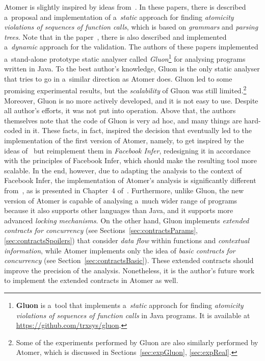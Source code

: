 Atomer is slightly inspired by ideas from~\cite{contracts2017, contracts2015}. In these papers, there is described a~proposal and implementation of a~\emph{static} approach for finding \emph{atomicity violations of sequences of function calls}, which is based on \emph{grammars} and \emph{parsing trees}. Note that in the paper~\cite{contracts2017}, there is also described and implemented a~\emph{dynamic} approach for the validation. The authors of these papers implemented a~stand-alone prototype static analyser called \emph{Gluon}\footnote{\textbf{Gluon} is a~tool that implements a~\emph{static} approach for finding \emph{atomicity violations of sequences of function calls} in Java programs. It is available at \url{https://github.com/trxsys/gluon}.} for analysing programs written in Java. To the best author's knowledge, Gluon is the only static analyser that tries to go in a~similar direction as Atomer does. Gluon led to some promising experimental results, but the \emph{scalability} of Gluon was still limited.\footnote{Some of the experiments performed by Gluon are also similarly performed by Atomer, which is discussed in Sections~\ref{sec:expGluon}, \ref{sec:expReal}.} Moreover, Gluon is no more actively developed, and it is not easy to use. Despite all author's efforts, it was not put into operation. Above that, the authors themselves note that the code of Gluon is very ad hoc, and many things are hard-coded in it. These facts, in fact, inspired the decision that eventually led to the implementation of the first version of Atomer, namely, to get inspired by the ideas of~\cite{contracts2017, contracts2015} but reimplement them in \emph{Facebook Infer}, redesigning it in accordance with the principles of Facebook Infer, which should make the resulting tool more scalable. In the end, however, due to adapting the analysis to the context of Facebook Infer, the implementation of Atomer's analysis is significantly different from~\cite{contracts2017, contracts2015}, as is presented in Chapter~4 of~\cite{harmimBP}. Furthermore, unlike Gluon, the new version of Atomer is capable of analysing a~much wider range of programs because it also supports other languages than Java, and it supports more advanced \emph{locking mechanisms}. On the other hand, Gluon implements \emph{extended contracts for concurrency} (see Sections~\ref{sec:contractsParams}, \ref{sec:contractsSpoilers}) that consider \emph{data flow} within functions and \emph{contextual information}, while Atomer implements only the idea of \emph{basic contracts for concurrency} (see Section~\ref{sec:contractsBasic}). These extended contracts should improve the precision of the analysis. Nonetheless, it is the author's future work to implement the extended contracts in Atomer as well.

